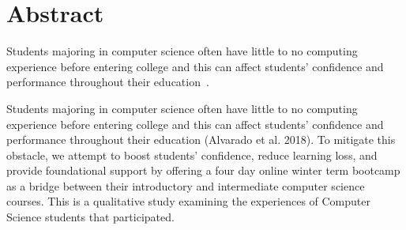 \documentclass[12pt]{article}
\title{}
\begin{document}
\section{Abstract}
Students majoring in computer science often have little to no computing
experience before entering college and this can affect students' confidence and
performance throughout their education~\cite{alv}.

Students majoring in computer science often have little to no computing
experience before entering college and this can affect students’ confidence and
performance throughout their education (Alvarado et al. 2018). To mitigate this
obstacle, we attempt to boost students’ confidence, reduce learning loss, and
provide foundational support by offering a four day online winter term bootcamp
as a bridge between their introductory and intermediate computer science
courses.  This is a qualitative study examining the experiences of Computer
Science students that participated.
\end{document}
